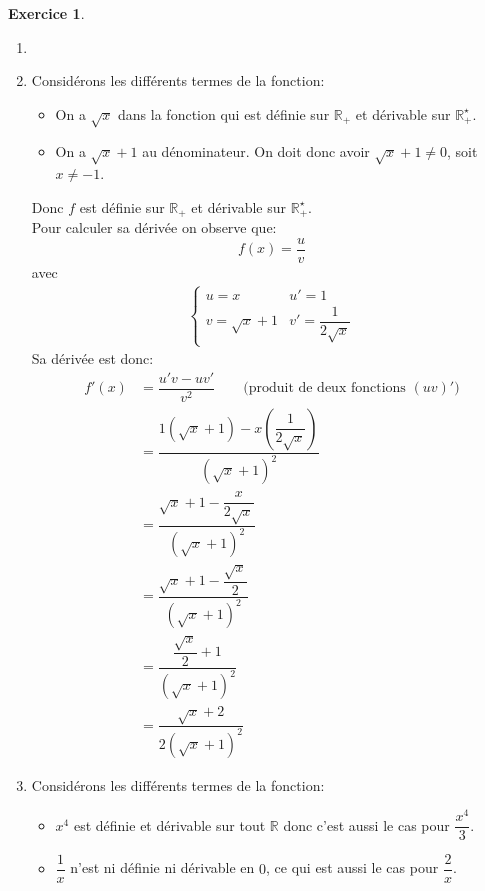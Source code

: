 \documentclass{exam}
\theoremstyle{definition}
\newtheorem{exercice}{Exercice}
\begin{document}
\begin{exercice}
    \begin{enumerate}
        \item[]
        \item Considérons les différents termes de la fonction:
        \begin{itemize}
            \item On a $\sqrt{x}$ dans la fonction qui est définie sur $\mathbb{R}_+$ et dérivable sur $\mathbb{R}_+^\star$.
            \item On a $\sqrt{x} + 1$ au dénominateur. On doit donc avoir $\sqrt{x} + 1 \neq 0$, soit $x \neq - 1$.
        \end{itemize}
        Donc $f$ est définie sur $\mathbb{R}_+$ et dérivable sur $\mathbb{R}_+^\star$.\\
        Pour calculer sa dérivée on observe que:
        $$
        f(x) = \dfrac{u}{v}
        $$
        avec
        \begin{align*}
        \begin{cases}
            u = x & u' = 1\\
            v = \sqrt{x} + 1 & v' = \dfrac{1}{2\sqrt{x}}
        \end{cases}
        \end{align*}
        Sa dérivée est donc:
        \begin{align*}
            f'\left(x\right) &= \dfrac{u'v - uv'}{v^2} \qquad \text{(produit de deux fonctions $(uv)'$)}\\
            &= \dfrac{1\left(\sqrt{x} + 1\right) - x\left(\dfrac{1}{2\sqrt{x}}\right)}{\left(\sqrt{x} + 1\right)^2}\\
            &= \dfrac{\sqrt{x} + 1 - \dfrac{x}{2\sqrt{x}}}{\left(\sqrt{x} + 1\right)^2}\\
            &= \dfrac{\sqrt{x} + 1 - \dfrac{\sqrt{x}}{2}}{\left(\sqrt{x} + 1\right)^2}\\
            &= \dfrac{\dfrac{\sqrt{x}}{2} + 1}{\left(\sqrt{x} + 1\right)^2}\\
            &= \dfrac{\sqrt{x} + 2}{2\left(\sqrt{x} + 1\right)^2}
        \end{align*}
        \item Considérons les différents termes de la fonction:
        \begin{itemize}
            \item $x^4$ est définie et dérivable sur tout $\mathbb{R}$ donc c'est aussi le cas pour $\dfrac{x^4}{3}$.
            \item $\dfrac{1}{x}$ n'est ni définie ni dérivable en $0$, ce qui est aussi le cas pour $\dfrac{2}{x}$.

\end{itemize}
\end{enumerate}
\end{exercice}
\end{document}
